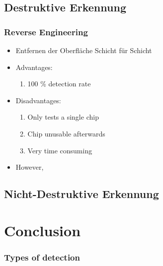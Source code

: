 \documentclass[11pt]{beamer}
\begin{document}
\subsection{Destruktive Erkennung}
\begin{frame}
    \frametitle{Reverse Engineering}
    \begin{itemize}
        \item Entfernen der Oberfläche Schicht für Schicht
        \item Advantages: 
        \begin{enumerate}
            \item 100 \% detection rate
        \end{enumerate}
        \item Disadvantages:
        \begin{enumerate}
            \item Only tests a single chip
            \item Chip unusable afterwards
            \item Very time consuming
        \end{enumerate}
        \item However, 
    \end{itemize}
\end{frame}
\subsection{Nicht-Destruktive Erkennung}
\section{Conclusion}
\begin{frame}
    \frametitle{Types of detection}
\end{frame}
\end{document}
